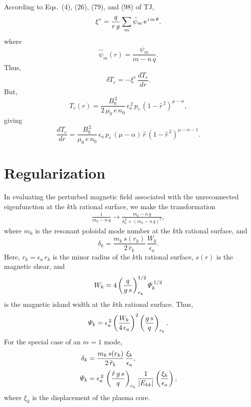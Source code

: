 \documentclass[12pt,prb,aps,notitlepage]{revtex4-1}
\begin{document}
According to Eqs.~(4), (26), (79), and (98) of TJ, 
\begin{equation}
\xi^r = \frac{q}{r\,g}\sum_m \hat{\psi}_m\,{\rm e}^{\,{\rm i}\,m\,\theta},
\end{equation}
where
\begin{equation}
\hat{\psi}_m(r) = \frac{\psi_m}{m-n\,q}.
\end{equation}
Thus,
\begin{equation}
\delta T_e = -\xi^r\,\frac{dT_e}{dr}.
\end{equation}
But,
\begin{equation}
T_e(r) = \frac{B_0^{\,2}}{2\,\mu_0\,e\,n_0}\,\epsilon_a^{\,2}\,p_c\,(1-\hat{r}^{\,2})^{\mu-\alpha},
\end{equation}
giving
\begin{equation}
\frac{dT_e}{dr} =  \frac{B_0^{\,2}}{\mu_0\,e\,n_0}\,\epsilon_a\,p_c\,(\mu-\alpha)\,\hat{r}\,(1-\hat{r}^{\,2})^{\mu-\alpha-1}.
\end{equation}

\section{Regularization}
In evaluating the perturbed magnetic field associated with the unreconnected eigenfunction at the $k$th rational surface, we make the
transformation
\begin{align}
\frac{1}{m_k-n\,q} \rightarrow \frac{m_k-n\,q}{\delta_k^{\,2} + (m_k-n\,q)^2},
\end{align}
where $m_k$ is the resonant poloidal mode number at the $k$th rational surface, and
\begin{equation}
\delta_k = \frac{m_k\,s(r_k)}{2\,\hat{r}_k}\,\frac{W_k}{\epsilon_a}.
\end{equation}
Here, $r_k=\epsilon_a\,\hat{r}_k$ is the minor radius of the $k$th rational surface, $s(r)$ is the magnetic shear, and 
\begin{equation}
W_k = 4\left(\frac{q}{g\,s}\right)_{r_k}^{1/2}{\mit\Psi}_k^{\,1/2}
\end{equation}
is the magnetic island width at the $k$th rational surface. 
Thus, 
\begin{equation}
{\mit\Psi}_k= \epsilon_a^{\,2} \left(\frac{W_k}{4\,\epsilon_a}\right)^2\left(\frac{g\,s}{q}\right)_{r_k}.
\end{equation}
For the special case of an $m=1$ mode,
\begin{align}
\delta_k &= \frac{m_k\,s(r_k)}{2\,\hat{r}_k}\,\frac{\xi_k}{\epsilon_a},\\[0.5ex]
{\mit\Psi}_k &= \epsilon_a^{\,2}\,\left(\frac{\hat{r}\,g\,s}{q}\right)_{r_k}\frac{1}{|E_{kk}|} \left(\frac{\xi_k}{\epsilon_a}\right),
\end{align}
where $\xi_k$ is the displacement of the plasma core. 
\end{document}
